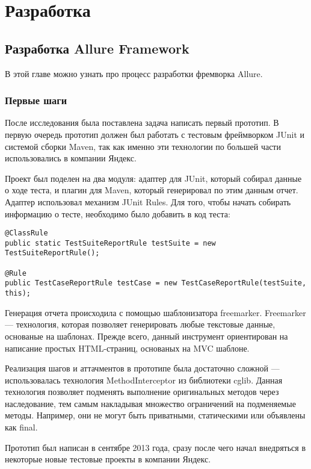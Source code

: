 \chapter{Разработка} 
\label{chapter3}

\section{Разработка Allure Framework}

В этой главе можно узнать про процесс разработки фремворка Allure.

\subsection{Первые шаги}

После исследования была поставлена задача написать первый прототип. В первую очередь прототип должен был работать с тестовым фреймворком JUnit и системой сборки Maven, так как именно эти технологии по большей части использовались в компании Яндекс. 

Проект был поделен на два модуля: адаптер для JUnit, который собирал данные о ходе теста, и плагин для Maven, который генерировал по этим данным отчет. Адаптер использовал механизм JUnit Rules. Для того, чтобы начать собирать информацию о тесте, необходимо было добавить в код теста:

\begin{lstlisting}[caption=Пример подключения к тестам JUnit Rules.]
@ClassRule
public static TestSuiteReportRule testSuite = new TestSuiteReportRule();

@Rule
public TestCaseReportRule testCase = new TestCaseReportRule(testSuite, this);
\end{lstlisting}


Генерация отчета происходила с помощью шаблонизатора freemarker. Freemarker --- технология, которая позволяет генерировать любые текстовые данные, основаные на шаблонах. Прежде всего, данный инструмент ориентирован на написание простых HTML-страниц, основаных на MVC шаблоне.

Реализация шагов и аттачментов в прототипе была достаточно сложной --- использовалась технология MethodInterceptor из библиотеки cglib. Данная технология позволяет подменять выполнение оригинальных методов через наследование, тем самым накладывая множество ограничений на подменяемые методы. Например, они не могут быть приватными, статическими или объявлены как final. 

Прототип был написан в сентябре 2013 года, сразу после чего начал внедряться в некоторые новые тестовые проекты в компании Яндекс.

